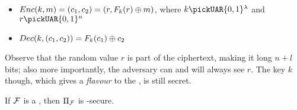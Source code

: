 \begin{itemize}
    \item $Enc(k, m) = (c_1, c_2) = (r, F_k(r) \oplus m)$, where $k \pickUAR \{0,1\}^\lambda$ and $r \pickUAR \{0,1\}^n$
    
    \item $Dec(k, (c_{1}, c_{2}))=F_{k}(c_{1}) \oplus c_{2}$
\end{itemize}

Observe that the random value $r$ is part of the ciphertext, making it long $n+l$ bits; also more importantly, the adversary can and will always see $r$. The key $k$ though, which gives a \textit{flavour} to the \prf, is still secret.

\begin{theorem} \label{thm:prfcpa}
    If $\mathcal{F}$ is a \prf, then $\Pi_{\mathcal{F}}$ is \cpa-secure.
\end{theorem}

